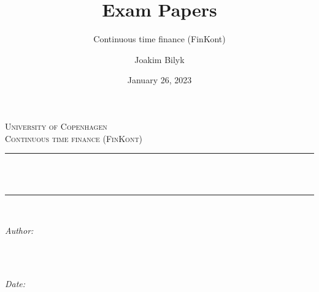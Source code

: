 \documentclass[
]{article}
\title{Exam Papers}
\subtitle{Continuous time finance (FinKont)}
\author{Joakim Bilyk}
\date{January 26, 2023}
\begin{document}

{
\begin{titlepage}
\newcommand{\HRule}{\rule{\linewidth}{0.5mm}} %

\center %
 

\textsc{\LARGE University of Copenhagen}\\[4cm] %
\textsc{\Large Continuous time finance
(FinKont)}\\[0.5cm] %


\HRule \\[0.4cm]
{ \huge \bfseries \thetitle}\\[0.4cm] %
\HRule \\[1.5cm]
 

\begin{minipage}{0.4\textwidth}
\begin{flushleft} \large
\emph{Author:}\\
\textsc{\theauthor} \\
\end{flushleft}
\end{minipage}
~
\begin{minipage}{0.4\textwidth}
\begin{flushright} \large
\emph{Date:} \\
\textsc{\thedate} \\
\end{flushright}
\end{minipage}\\[2cm]


\end{titlepage}}
\end{document}
